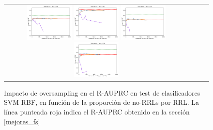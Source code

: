 \begin{figure}[h!]
\begin{tabular}{cccc}
\includegraphics[width=0.25\textwidth]{Kap7/UNIFIED_train=b278_test=b234_rbf_curves.png}  \includegraphics[width=0.25\textwidth]{Kap7/UNIFIED_train=b278_test=b261_rbf_curves.png} 
 \includegraphics[width=0.25\textwidth]{Kap7/UNIFIED_train=b360_test=b234_rbf_curves.png}  \includegraphics[width=0.25\textwidth]{Kap7/UNIFIED_train=b360_test=b278_rbf_curves.png} 
\end{tabular}
\caption{Impacto de oversampling en el R-AUPRC en test de clasificadores SVM RBF, en función de la proporción de no-RRLs por RRL. La línea punteada roja indica el R-AUPRC obtenido en la sección \protect\ref{mejores_fs}}
\label{fig:svmk_oversampling}
\end{figure}

